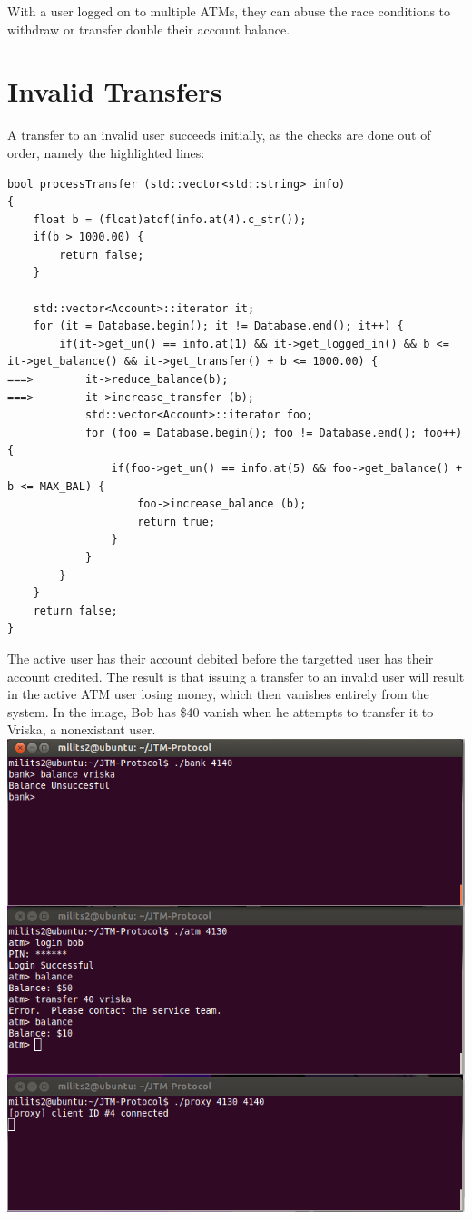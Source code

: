 \documentclass{article}
\begin{document}
With a user logged on to multiple ATMs, they can abuse the race conditions to withdraw or transfer double their account balance.

\section{Invalid Transfers}
A transfer to an invalid user succeeds initially, as the checks are done out of order, namely the highlighted lines:

\begin{lstlisting}
bool processTransfer (std::vector<std::string> info)
{
	float b = (float)atof(info.at(4).c_str());
	if(b > 1000.00) {
		return false;
	}

	std::vector<Account>::iterator it;
	for (it = Database.begin(); it != Database.end(); it++) {
		if(it->get_un() == info.at(1) && it->get_logged_in() && b <= it->get_balance() && it->get_transfer() + b <= 1000.00) {
===>		it->reduce_balance(b);
===>		it->increase_transfer (b);
			std::vector<Account>::iterator foo;
			for (foo = Database.begin(); foo != Database.end(); foo++) {
				if(foo->get_un() == info.at(5) && foo->get_balance() + b <= MAX_BAL) {
					foo->increase_balance (b);
					return true;
				}
			}
		}
	}
	return false;
}
\end{lstlisting}
The active user has their account debited before the targetted user has their account credited. The result is that issuing a transfer to an invalid user will result in the active ATM user losing money, which then vanishes entirely from the system. In the image, Bob has \$40 vanish when he attempts to transfer it to Vriska, a nonexistant user.
\\
\includegraphics[scale=0.5]{transferLoss.png}
\\
\end{document}
